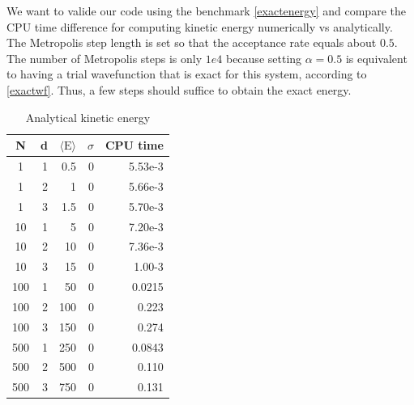 \documentclass[english, a4paper]{article}
\begin{document}
We want to valide our code using the benchmark \eqref{exactenergy} and
compare the CPU time difference for computing kinetic energy numerically vs analytically. 
The Metropolis step length is set so that the acceptance rate equals about $0.5$.
The number of Metropolis steps is only $1e4$ because setting $\alpha = 0.5$ is equivalent to
having a trial wavefunction that is exact for this system, according to \eqref{exactwf}. Thus, a few steps should suffice
to obtain the exact energy.

\begin{table}[H]
  \centering
  \begin{tabular}{ | c | r | r | r | r |}
    \hline
    N& d& $\langle \textrm{E}\rangle$& $\sigma$& CPU time \\*
    \hline
    1& 1& 0.5& 0& 5.53e-3 \\*
    \hline
    1& 2& 1& 0&  5.66e-3\\*
    \hline
    1& 3& 1.5& 0&  5.70e-3\\*
    \hline
    10& 1& 5& 0&  7.20e-3\\*
    \hline
    10& 2& 10& 0&  7.36e-3\\*
    \hline
    10& 3& 15& 0&  1.00-3\\*
    \hline
    100& 1& 50& 0&  0.0215\\*
    \hline
    100& 2& 100& 0&  0.223\\*
    \hline
    100& 3& 150& 0&  0.274\\*
    \hline
    500& 1& 250& 0&  0.0843\\*
    \hline
    500& 2& 500& 0&  0.110\\*
    \hline
    500& 3& 750& 0&  0.131\\*
    \hline
  \end{tabular}
  \caption{Analytical kinetic energy}
  \label{tab:Tabell1}
\end{table}
\end{document}
